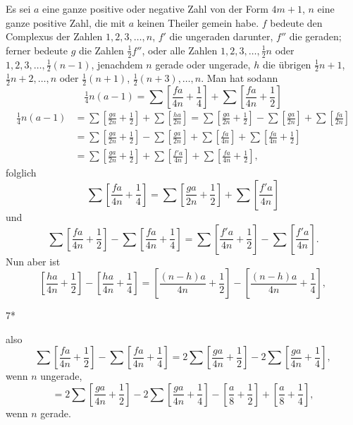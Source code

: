 \NoSourceHead
{}
\par\indent Es sei $a$ eine ganze positive oder negative Zahl von der Form $4m+1$, $n$ eine ganze positive Zahl, die mit $a$ keinen Theiler gemein habe. $f$ bedeute den Complexus der Zahlen $1,2,3,\ldots,n$, $f'$ die ungeraden darunter, $f''$ die geraden; ferner bedeute $g$ die Zahlen $\tfrac12f''$, oder alle Zahlen $1,2,3,\ldots,\tfrac12n$ oder $1,2,3,\ldots,\tfrac12(n-1)$, jenachdem $n$ gerade oder ungerade, $h$ die übrigen $\tfrac12n+1$, $\tfrac12n+2,\ldots,n$ oder $\tfrac12(n+1)$, $\tfrac12(n+3),\ldots,n$. Man hat sodann
\[
\tfrac14n(a-1)=\sum\left[\frac{fa}{4n}+\frac14\right]+\sum\left[\frac{fa}{4n}+\frac12\right]
\]
\[
\begin{aligned}
\tfrac14n(a-1)&=\sum\left[\frac{ga}{2n}+\frac12\right]+\sum\left[\frac{ha}{2n}\right]
=\sum\left[\frac{ga}{2n}+\frac12\right]-\sum\left[\frac{ga}{2n}\right]+\sum\left[\frac{fa}{2n}\right]\\
&=\sum\left[\frac{ga}{2n}+\frac12\right]-\sum\left[\frac{ga}{2n}\right]+\sum\left[\frac{fa}{4n}\right]+\sum\left[\frac{fa}{4n}+\frac12\right]\\
&=\sum\left[\frac{ga}{2n}+\frac12\right]+\sum\left[\frac{f'a}{4n}\right]+\sum\left[\frac{fa}{4n}+\frac12\right],
\end{aligned}
\]
\noindent folglich
\[
\sum\left[\frac{fa}{4n}+\frac14\right]=\sum\left[\frac{ga}{2n}+\frac12\right]+\sum\left[\frac{f'a}{4n}\right]
\]
\noindent und
\[
\sum\left[\frac{fa}{4n}+\frac12\right]-\sum\left[\frac{fa}{4n}+\frac14\right]=\sum\left[\frac{f'a}{4n}+\frac12\right]-\sum\left[\frac{f'a}{4n}\right].
\]
\noindent Nun aber ist
\[
\left[\frac{ha}{4n}+\frac12\right]-\left[\frac{ha}{4n}+\frac14\right]=\left[\frac{(n-h)a}{4n}+\frac12\right]-\left[\frac{(n-h)a}{4n}+\frac14\right],
\]
\par\vfill\noindent\hfill7*\par
\clearpage

\noindent also
\[
\sum\left[\frac{fa}{4n}+\frac12\right]-\sum\left[\frac{fa}{4n}+\frac14\right]=2\sum\left[\frac{ga}{4n}+\frac12\right]-2\sum\left[\frac{ga}{4n}+\frac14\right],
\]
\noindent wenn $n$ ungerade,
\[
=2\sum\left[\frac{ga}{4n}+\frac12\right]-2\sum\left[\frac{ga}{4n}+\frac14\right]-\left[\frac a8+\frac12\right]+\left[\frac a8+\frac14\right],
\]
\noindent wenn $n$ gerade.

